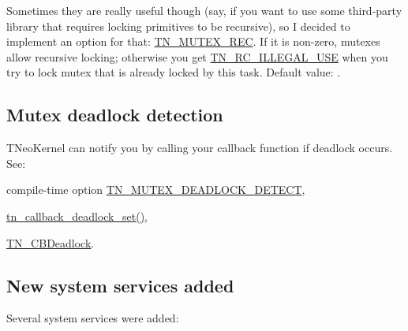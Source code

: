 Sometimes they are really useful though (say, if you want to use some third-\/party library that requires locking primitives to be recursive), so I decided to implement an option for that\+: {\ttfamily \hyperlink{tn__cfg__default_8h_a2557da78508c4241aceee92475df3581}{T\+N\+\_\+\+M\+U\+T\+E\+X\+\_\+\+R\+E\+C}}. If it is non-\/zero, mutexes allow recursive locking; otherwise you get {\ttfamily \hyperlink{tn__common_8h_aa43bd3da1ad4c1e61224b5f23b369876a2c83a60bf543df45b5045d6f7fbc7d0c}{T\+N\+\_\+\+R\+C\+\_\+\+I\+L\+L\+E\+G\+A\+L\+\_\+\+U\+S\+E}} when you try to lock mutex that is already locked by this task. Default value\+: {}.\hypertarget{tnkernel_diff_tnkernel_diff_mutex_deadlock}{}\subsection{Mutex deadlock detection}\label{tnkernel_diff_tnkernel_diff_mutex_deadlock}
T\+Neo\+Kernel can notify you by calling your callback function if deadlock occurs. See\+:


\begin{DoxyItemize}
\item compile-\/time option {\ttfamily \hyperlink{tn__cfg__default_8h_a6ed3ec7b0d4338e7f60dde86b7ea5fa4}{T\+N\+\_\+\+M\+U\+T\+E\+X\+\_\+\+D\+E\+A\+D\+L\+O\+C\+K\+\_\+\+D\+E\+T\+E\+C\+T}},
\item {\ttfamily \hyperlink{tn__sys_8h_aaa4a5c2feb4a0db5993b81dde496edc3}{tn\+\_\+callback\+\_\+deadlock\+\_\+set()}},
\item {\ttfamily \hyperlink{tn__sys_8h_a3b66b641f86c86851633748dc968fde7}{T\+N\+\_\+\+C\+B\+Deadlock}}.
\end{DoxyItemize}\hypertarget{tnkernel_diff_tnkernel_diff_new_functions}{}\subsection{New system services added}\label{tnkernel_diff_tnkernel_diff_new_functions}
Several system services were added\+:


